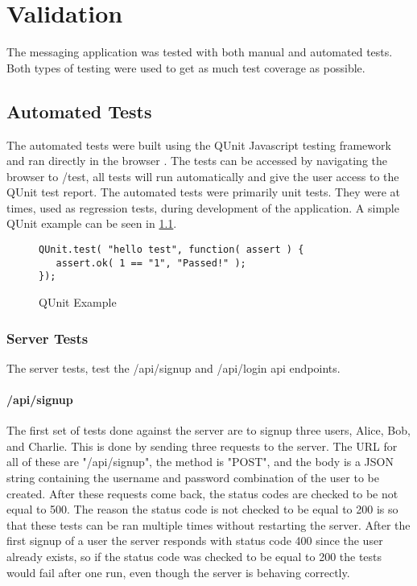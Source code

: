 \chapter{Validation}


The messaging application was tested with both manual and automated tests. Both types of testing were used to get as much test coverage as possible.


\section{Automated Tests}


The automated tests were built using the QUnit Javascript testing framework and ran directly in the browser \cite{qunit}. The tests can be accessed by navigating the browser to /test, all tests will run automatically and give the user access to the QUnit test report. The automated tests were primarily unit tests. They were at times, used as regression tests, during development of the application. A simple QUnit example can be seen in \ref{fig:qunit}. 


\begin{figure}[!htbp]
\centering
 \begin{lstlisting}[basicstyle=\small]
QUnit.test( "hello test", function( assert ) {
   assert.ok( 1 == "1", "Passed!" );
});
 \end{lstlisting}
  \caption{QUnit Example}
\label{fig:qunit}
\end{figure}

\subsection{Server Tests}


The server tests, test the /api/signup and /api/login api endpoints. 


\subsubsection{/api/signup}


The first set of tests done against the server are to signup three users, Alice, Bob, and Charlie.
This is done by sending three requests to the server. The URL for all of these are "/api/signup", the method is "POST", and the body is a JSON string containing the username and password combination of the user to be created. After these requests come back, the status codes are checked to be not equal to 500. The reason the status code is not checked to be equal to 200 is so that these tests can be ran multiple times without restarting the server. After the first signup of a user the server responds with status code 400 since the user already exists, so if the status code was checked to be equal to 200 the tests would fail after one run, even though the server is behaving correctly.


